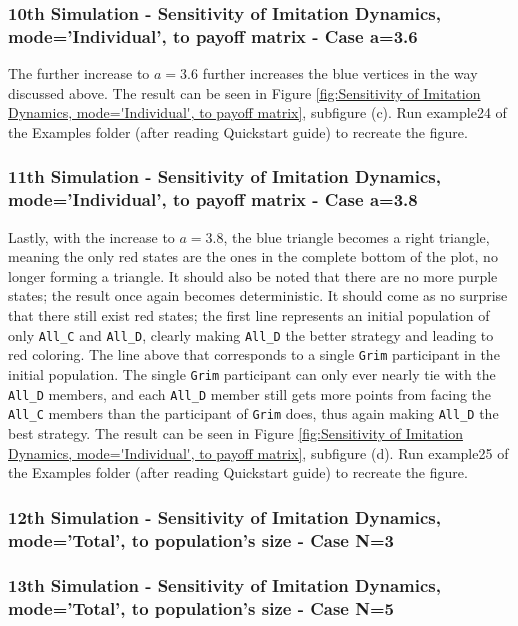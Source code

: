 \subsubsection{10th Simulation - Sensitivity of Imitation Dynamics, mode='Individual', to payoff matrix - Case a=3.6}
The further increase to $a=3.6$ further increases the blue vertices in the way discussed above. The result can be seen in Figure \ref{fig:Sensitivity of Imitation Dynamics, mode='Individual', to payoff matrix}, subfigure (c). Run example24 of the Examples folder (after reading Quickstart guide) to recreate the figure.

\subsubsection{11th Simulation - Sensitivity of Imitation Dynamics, mode='Individual', to payoff matrix - Case a=3.8}
Lastly, with the increase to $a=3.8$, the blue triangle becomes a right triangle, meaning the only red states are the ones in the complete bottom of the plot, no longer forming a triangle. It should also be noted that there are no more purple states; the result once again becomes deterministic. It should come as no surprise that there still exist red states; the first line represents an initial population of only \texttt{All\_C} and \texttt{All\_D}, clearly making \texttt{All\_D} the better strategy and leading to red coloring. The line above that corresponds to a single \texttt{Grim} participant in the initial population. The single \texttt{Grim} participant can only ever nearly tie with the \texttt{All\_D} members, and each \texttt{All\_D} member still gets more points from facing the \texttt{All\_C} members than the participant of \texttt{Grim} does, thus again making \texttt{All\_D} the best strategy. The result can be seen in Figure \ref{fig:Sensitivity of Imitation Dynamics, mode='Individual', to payoff matrix}, subfigure (d). Run example25 of the Examples folder (after reading Quickstart guide) to recreate the figure.

\subsubsection{12th Simulation - Sensitivity of Imitation Dynamics, mode='Total', to population's size - Case N=3}

\subsubsection{13th Simulation - Sensitivity of Imitation Dynamics, mode='Total', to population's size - Case N=5}

